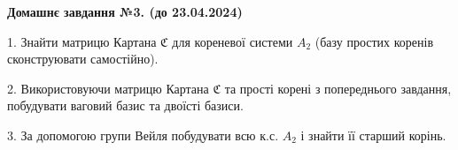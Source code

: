 \documentclass[11pt,fleqn]{article}
\begin{document}
\begin{center}
\LARGE \bf
Домашнє завдання №3. (до 23.04.2024)
\end{center}

1. Знайти матрицю Картана $\mathfrak{C}$ для кореневої системи $A_2$ (базу простих коренів сконструювати самостійно).


2. Використовуючи матрицю Картана $\mathfrak{C}$ та прості корені з попереднього завдання, побудувати ваговий базис та двоїсті базиси.


3. За допомогою групи Вейля побудувати всю к.с. $A_2$ і знайти її старший корінь.
\end{document}

